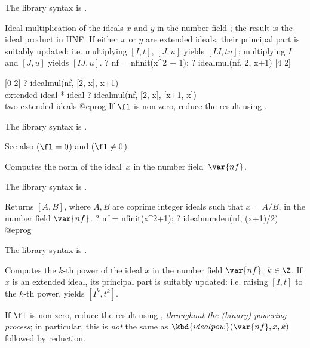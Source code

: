 The library syntax is .

\label{se:idealmul}
Ideal multiplication of the ideals $x$ and $y$ in the number field
; the result is the ideal product in HNF. If either $x$ or $y$
are extended ideals, their principal part is suitably
updated: i.e. multiplying $[I,t]$, $[J,u]$ yields $[IJ, tu]$; multiplying
$I$ and $[J, u]$ yields $[IJ, u]$.
\bprog
? nf = nfinit(x^2 + 1);
? idealmul(nf, 2, x+1)
[4 2]

[0 2]
? idealmul(nf, [2, x], x+1)        \\ extended ideal * ideal
? idealmul(nf, [2, x], [x+1, x])   \\ two extended ideals
@eprog\noindent
If $\fl$ is non-zero, reduce the result using .

The library syntax is .

\noindent See also
 ($\fl=0$) and
 ($\fl\neq0$).

\label{se:idealnorm}
Computes the norm of the ideal~$x$ in the number field~$\var{nf}$.

The library syntax is .

\label{se:idealnumden}
Returns $[A,B]$, where $A,B$ are coprime integer ideals
such that $x = A/B$, in the number field $\var{nf}$.
\bprog
? nf = nfinit(x^2+1);
? idealnumden(nf, (x+1)/2)
@eprog

The library syntax is .

\label{se:idealpow}
Computes the $k$-th power of
the ideal $x$ in the number field $\var{nf}$; $k\in\Z$.
If $x$ is an extended
ideal, its principal part is suitably
updated: i.e. raising $[I,t]$ to the $k$-th power, yields $[I^k, t^k]$.

If $\fl$ is non-zero, reduce the result using , \emph{throughout
the (binary) powering process}; in particular, this is \emph{not} the same
as $\kbd{idealpow}(\var{nf},x,k)$ followed by reduction.


